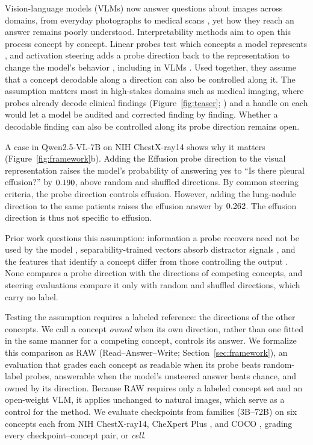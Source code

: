 \documentclass[11pt]{article}
\begin{document}
Vision-language models (VLMs) now answer questions about images across domains, from everyday photographs to medical scans \citep{liu2024improved,bai2025qwen25vl,li2023llavamed,sellergren2025medgemma}, yet how they reach an answer remains poorly understood. Interpretability methods aim to open this process concept by concept. Linear probes test which concepts a model represents \citep{alain2017understanding,belinkov2022probing}, and activation steering adds a probe direction back to the representation to change the model's behavior \citep{turner2023steering,panickssery2024caa}, including in VLMs \citep{rajaram2025lineofsight,ferrando2026explain}. Used together, they assume that a concept decodable along a direction can also be controlled along it. The assumption matters most in high-stakes domains such as medical imaging, where probes already decode clinical findings (Figure~\ref{fig:teaser}; \citealp{zhu2026lost,pedersen2026probes}) and a handle on each would let a model be audited and corrected finding by finding. Whether a decodable finding can also be controlled along its probe direction remains open.

A case in Qwen2.5-VL-7B \citep{bai2025qwen25vl} on NIH ChestX-ray14 \citep{wang2017chestxray} shows why it matters (Figure~\ref{fig:framework}b). Adding the Effusion probe direction to the visual representation raises the model's probability of answering yes to ``Is there pleural effusion?'' by $0.190$, above random and shuffled directions. By common steering criteria, the probe direction controls effusion. However, adding the lung-nodule direction to the same patients raises the effusion answer by $0.262$. The effusion direction is thus not specific to effusion.

Prior work questions this assumption: information a probe recovers need not be used by the model \citep{ravichander2021probing}, separability-trained vectors absorb distractor signals \citep{pahde2025navigating}, and the features that identify a concept differ from those controlling the output \citep{arad2025saes}. None compares a probe direction with the directions of competing concepts, and steering evaluations compare it only with random and shuffled directions, which carry no label.

Testing the assumption requires a labeled reference: the directions of the other concepts. We call a concept \emph{owned} when its own direction, rather than one fitted in the same manner for a competing concept, controls its answer. We formalize this comparison as RAW (Read--Answer--Write; Section~\ref{sec:framework}), an evaluation that grades each concept as readable when its probe beats random-label probes, answerable when the model's unsteered answer beats chance, and owned by its direction. Because RAW requires only a labeled concept set and an open-weight VLM, it applies unchanged to natural images, which serve as a control for the method. We evaluate \cfCheckpoints{} checkpoints from \cfFamiliesWord{} families (3B--72B) on six concepts each from NIH ChestX-ray14, CheXpert Plus \citep{chambon2024chexpertplus}, and COCO \citep{lin2014coco}, grading every checkpoint--concept pair, or \emph{cell}.
\end{document}
